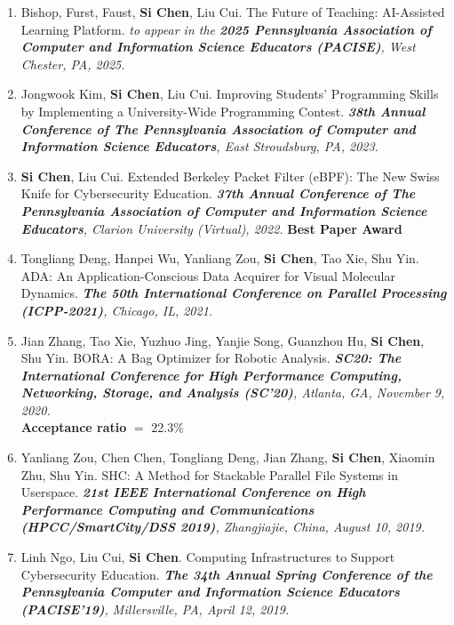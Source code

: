 \documentclass[letter]{article}
\newcommand{\publication}[4]{\item #1. #2. \emph{#3.} #4}
\begin{document}
\begin{description}
\begin{enumerate}[{C-}1.]
\publication{Bishop, Furst, Faust, \textbf{Si Chen}, Liu Cui}
            {The Future of Teaching: AI-Assisted Learning Platform}
            {\textit{to appear in} the \textbf{2025 Pennsylvania Association of Computer and Information Science Educators (PACISE)}, West Chester, PA, 2025}\\



\publication{Jongwook Kim, \textbf{Si Chen}, Liu Cui} {Improving Students' Programming Skills by Implementing a University-Wide Programming Contest} {\textbf{38th Annual Conference of The Pennsylvania Association of Computer and Information Science Educators}, East Stroudsburg, PA, 2023}\\

\publication{\textbf{Si Chen}, Liu Cui} {Extended Berkeley Packet Filter (eBPF): The New Swiss Knife for Cybersecurity Education}  {\textbf{37th Annual Conference of The Pennsylvania Association of Computer and Information Science Educators}, Clarion University (Virtual), 2022}
\textbf{Best Paper Award}\\

\publication{Tongliang Deng, Hanpei Wu, Yanliang Zou, \textbf{Si Chen}, Tao Xie, Shu Yin} {ADA: An Application-Conscious Data Acquirer for Visual Molecular Dynamics}  {\textbf{The 50th International Conference on Parallel Processing (ICPP-2021)}, Chicago, IL, 2021}\\

\publication{Jian Zhang, Tao Xie, Yuzhuo Jing, Yanjie Song, Guanzhou Hu, \textbf{Si Chen}, Shu Yin} {BORA: A Bag Optimizer for Robotic Analysis}  {\textbf{SC20: The International Conference for High Performance Computing, Networking, Storage, and Analysis (SC'20)}, Atlanta, GA, November 9, 2020} \\ 
\textbf{Acceptance ratio} $=$ 22.3\% \\

\publication{Yanliang Zou, Chen Chen, Tongliang Deng, Jian Zhang, \textbf{Si Chen}, Xiaomin Zhu, Shu Yin} {SHC: A Method for Stackable Parallel File Systems in Userspace}  {\textbf{21st IEEE International Conference on High Performance Computing and Communications (HPCC/SmartCity/DSS 2019)}, Zhangjiajie, China, August 10, 2019} \\ 

\publication{Linh Ngo, Liu Cui, \textbf{Si Chen}} {Computing Infrastructures to Support Cybersecurity Education}  {\textbf{The 34th Annual Spring Conference of the Pennsylvania Computer and Information Science Educators (PACISE'19)}, Millersville, PA, April 12, 2019} \\


\end{enumerate}
\end{description}
\end{document}
